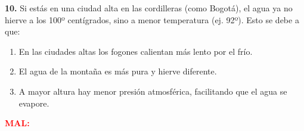 \documentclass[12pt, letterpaper]{article}
\newif\ifshowanswers
\newcommand{\retroalimentacion}[3]{
	\ifshowanswers
	\vspace{0.2cm}
	\noindent\textcolor{gray}{\rule{\textwidth}{2pt}} %
	\par\vspace{0.1cm}
	\noindent \textbf{\textcolor{blue}{BIEN: #1 \quad \textit{(#2)}}}
	
	\if\relax\detokenize{#3}\relax
	\else
	\par\vspace{0.1cm}
	\noindent \textbf{\textcolor{red}{MAL: \textit{#3}}}
	\fi
	\vspace{0.6cm}
	\else
	\vspace{1.2cm} %
	\fi
}
\begin{document}
	\noindent \textbf{10.} Si estás en una ciudad alta en las cordilleras (como Bogotá), el agua ya no hierve a los 100º centígrados, sino a menor temperatura (ej. 92º). Esto se debe a que:
	\begin{enumerate}[label=\alph*)]
		\item En las ciudades altas los fogones calientan más lento por el frío.
		\item El agua de la montaña es más pura y hierve diferente.
		\item A mayor altura hay menor presión atmosférica, facilitando que el agua se evapore.
	\end{enumerate}
	\retroalimentacion{c}{Exacto. Esta técnica de medir la altura por la ebullición se llama "Hipsometría".}{}
	
\end{document}

